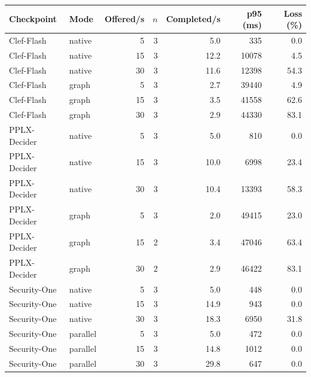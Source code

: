 \begin{tabular}{llrrrrr}
\toprule
Checkpoint & Mode & Offered/s & $n$ & Completed/s & p95 (ms) & Loss (\%) \\
\midrule
Clef-Flash & native & 5 & 3 & 5.0 & 335 & 0.0 \\
Clef-Flash & native & 15 & 3 & 12.2 & 10078 & 4.5 \\
Clef-Flash & native & 30 & 3 & 11.6 & 12398 & 54.3 \\
Clef-Flash & graph & 5 & 3 & 2.7 & 39440 & 4.9 \\
Clef-Flash & graph & 15 & 3 & 3.5 & 41558 & 62.6 \\
Clef-Flash & graph & 30 & 3 & 2.9 & 44330 & 83.1 \\
PPLX-Decider & native & 5 & 3 & 5.0 & 810 & 0.0 \\
PPLX-Decider & native & 15 & 3 & 10.0 & 6998 & 23.4 \\
PPLX-Decider & native & 30 & 3 & 10.4 & 13393 & 58.3 \\
PPLX-Decider & graph & 5 & 3 & 2.0 & 49415 & 23.0 \\
PPLX-Decider & graph & 15 & 2 & 3.4 & 47046 & 63.4 \\
PPLX-Decider & graph & 30 & 2 & 2.9 & 46422 & 83.1 \\
Security-One & native & 5 & 3 & 5.0 & 448 & 0.0 \\
Security-One & native & 15 & 3 & 14.9 & 943 & 0.0 \\
Security-One & native & 30 & 3 & 18.3 & 6950 & 31.8 \\
Security-One & parallel & 5 & 3 & 5.0 & 472 & 0.0 \\
Security-One & parallel & 15 & 3 & 14.8 & 1012 & 0.0 \\
Security-One & parallel & 30 & 3 & 29.8 & 647 & 0.0 \\
\bottomrule
\end{tabular}
